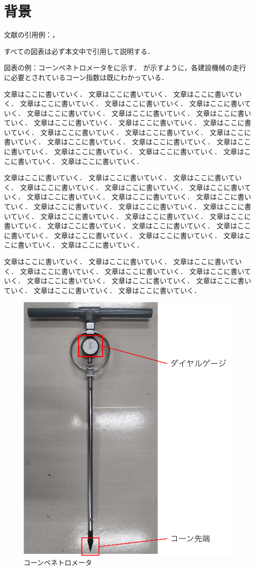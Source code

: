 \documentclass[../main]{subfiles}
\begin{document}
\graphicspath{{../figures/chap1/}}

\section{背景}
\label{sec:intro_background}
文献の引用例：，

すべての図表は必ず本文中で引用して説明する．

図表の例：コーンペネトロメータをに示す．
が示すように，各建設機械の走行に必要とされているコーン指数は既にわかっている．

文章はここに書いていく．
文章はここに書いていく．
文章はここに書いていく．
文章はここに書いていく．
文章はここに書いていく．
文章はここに書いていく．
文章はここに書いていく．
文章はここに書いていく．
文章はここに書いていく．
文章はここに書いていく．
文章はここに書いていく．
文章はここに書いていく．
文章はここに書いていく．
文章はここに書いていく．
文章はここに書いていく．
文章はここに書いていく．
文章はここに書いていく．
文章はここに書いていく．
文章はここに書いていく．
文章はここに書いていく．
文章はここに書いていく．
文章はここに書いていく．

文章はここに書いていく．
文章はここに書いていく．
文章はここに書いていく．
文章はここに書いていく．
文章はここに書いていく．
文章はここに書いていく．
文章はここに書いていく．
文章はここに書いていく．
文章はここに書いていく．
文章はここに書いていく．
文章はここに書いていく．
文章はここに書いていく．
文章はここに書いていく．
文章はここに書いていく．
文章はここに書いていく．
文章はここに書いていく．
文章はここに書いていく．
文章はここに書いていく．
文章はここに書いていく．
文章はここに書いていく．
文章はここに書いていく．
文章はここに書いていく．

文章はここに書いていく．
文章はここに書いていく．
文章はここに書いていく．
文章はここに書いていく．
文章はここに書いていく．
文章はここに書いていく．
文章はここに書いていく．
文章はここに書いていく．
文章はここに書いていく．
文章はここに書いていく．
文章はここに書いていく．


\begin{figure}[t]
  \centering
  \includegraphics[keepaspectratio, width=0.5\linewidth]{cone_penetrometer.pdf}
  \caption{コーンペネトロメータ}
  \label{fig:cone_penetrometer}
\end{figure}
\end{document}
